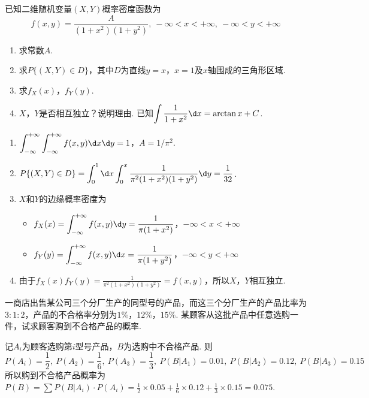 \begin{problem}
    已知二维随机变量$(X,Y)$概率密度函数为
    \[f(x,y)=\frac{A}{(1+x^2)(1+y^2)},\ -\infty<x<+\infty,\ -\infty<y<+\infty\]
    \begin{enumerate}
        \item 求常数$A$.
        \item 求$P\{(X,Y)\in D\}$，其中$D$为直线$y=x$，$x=1$及$x$轴围成的三角形区域.
        \item 求$f_X(x)$，$f_Y(y)$.
        \item $X$，$Y$是否相互独立？说明理由. 已知$\displaystyle\int\frac1{1+x^2}\d x=\arctan x+C$.
    \end{enumerate}
\end{problem}
\begin{solution}\leavevmode
    \begin{enumerate}
        \item $\displaystyle\int_{-\infty}^{+\infty}\int_{-\infty}^{+\infty}f(x,y)\d x\d y=1$，$A=1/\pi^2$.
        \item 
        $\displaystyle P\{(X,Y)\in D\}=\int_0^1\d x\int_0^x\frac{1}{\pi^2(1+x^2)(1+y^2)}\d y=\frac1{32}$.
        \item $X$和$Y$的边缘概率密度为
        \begin{itemize}
            \item $\displaystyle f_X(x)=\int_{-\infty}^{+\infty}f(x,y)\d y=\frac{1}{\pi(1+x^2)}$，$-\infty<x<+\infty$
            \item $\displaystyle f_Y(y)=\int_{-\infty}^{+\infty}f(x,y)\d x=\frac{1}{\pi(1+y^2)}$，$-\infty<y<+\infty$
        \end{itemize}
        \item 由于$\displaystyle f_X(x)f_Y(y)=\frac1{\pi^2(1+x^2)(1+y^2)}=f(x,y)$，所以$X$，$Y$相互独立.
    \end{enumerate}
\end{solution}

\begin{problem}
    一商店出售某公司三个分厂生产的同型号的产品，而这三个分厂生产的产品比率为$3:1:2$，产品的不合格率分别为$1\%$，$12\%$，$15\%$. 某顾客从这批产品中任意选购一件，试求顾客购到不合格产品的概率.
\end{problem}
\begin{solution}
    记$A_i$为顾客选购第$i$型号产品，$B$为选购中不合格产品. 则
    \[P(A_i)=\frac12,\ P(A_2)=\frac16,\ P(A_3)=\frac13,\ P(B|A_1)=0.01,\ P(B|A_2)=0.12,\ P(B|A_3)=0.15\]
    所以购到不合格产品概率为$P(B)=\sum P(B|A_i)\cdot P(A_i)=\frac12\times0.05+\frac16\times0.12+\frac13\times0.15=0.075$.
\end{solution}

